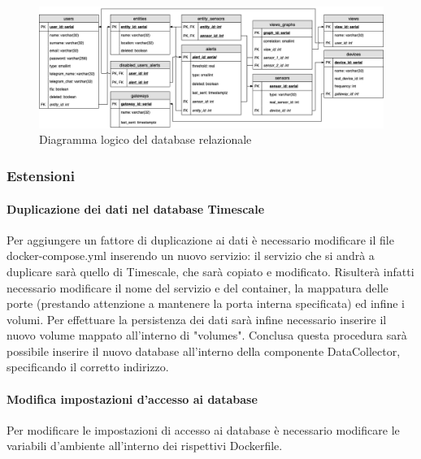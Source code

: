 			\begin{landscape}
			\begin{figure}[H]
				\centering
				\includegraphics[scale=0.600]{res/images/DATABASE/ER_Modificato.png}
				\caption{Diagramma logico del database relazionale}
				\label{Diagramma 9}
			\end{figure}
			\end{landscape}
	\subsubsection{Estensioni}
		\paragraph{Duplicazione dei dati nel database Timescale}
			Per aggiungere un fattore di duplicazione ai dati è necessario modificare il file docker-compose.yml inserendo un nuovo servizio: il servizio che si andrà a duplicare sarà quello di Timescale, che sarà copiato e modificato.
			\newline
			Risulterà infatti necessario modificare il nome del servizio e del container, la mappatura delle porte (prestando attenzione a mantenere la porta interna specificata) ed infine i volumi.
			\newline
			Per effettuare la persistenza dei dati sarà infine necessario inserire il nuovo volume mappato all'interno di "volumes".
			Conclusa questa procedura sarà possibile inserire il nuovo database all'interno della componente DataCollector, specificando il corretto indirizzo.

		\paragraph{Modifica impostazioni d'accesso ai database}	
			Per modificare le impostazioni di accesso ai database è necessario modificare le variabili d'ambiente all'interno dei rispettivi Dockerfile.		